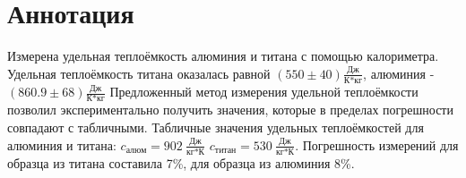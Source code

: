 \chapter*{Аннотация}

     Измерена удельная теплоёмкость алюминия и титана с помощью калориметра. Удельная теплоёмкость титана оказалась равной $(550 \pm 40) \frac{\text{Дж}}{\text{К*кг}}$, алюминия - $(860.9 \pm 68) \frac{\text{Дж}}{\text{К*кг}}$  Предложенный метод измерения удельной теплоёмкости позволил экспериментально получить значения, которые в пределах погрешности совпадают с табличными.  Табличные значения удельных теплоёмкостей для алюминия и титана: $c_{\text{алюм}} = 902~\frac{\text{Дж}}{\text{кг*К}}$ $ c_{\text{титан}} = 530~\frac{\text{Дж}}{\text{кг*К}}$. Погрешность измерений для образца из титана составила 7\%, для образца из алюминия 8\%.

